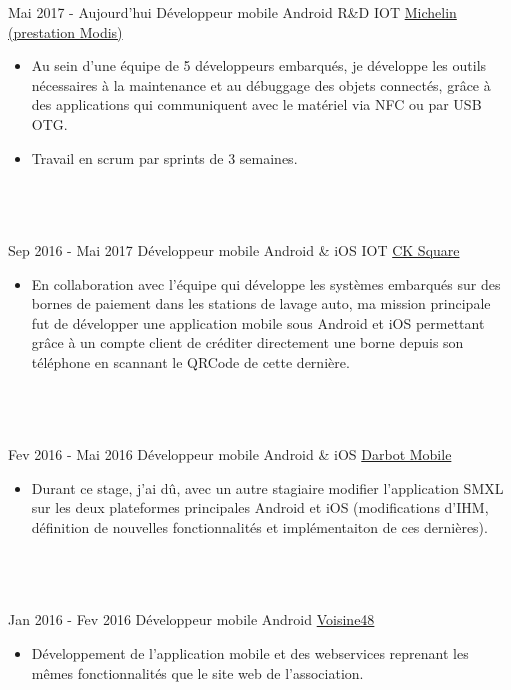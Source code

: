 \documentclass[letterpaper]{twentysecondcv} %
\begin{document}
\begin{twenty} %
\twentyitem
    	{Mai 2017 -}
		{Aujourd'hui}
        {Développeur mobile Android R\&D IOT}
        {\href{http://www.michelin.fr/}{Michelin (prestation Modis)}}
        {}
        {\begin{itemize}
        \item Au sein d'une équipe de 5 développeurs embarqués, je développe les outils nécessaires à la maintenance et au débuggage des objets connectés, grâce à des applications qui communiquent avec le matériel via NFC ou par USB OTG.
        \item Travail en scrum par sprints de 3 semaines.
        \end{itemize}}
        \\ \\ \\
	\twentyitem
    	{Sep 2016 -}
		{Mai 2017}
        {Développeur mobile Android \& iOS IOT}
        {\href{http://www.cksquare.fr/}{CK Square}}
        {}
        {
        {\begin{itemize}
        \item En collaboration avec l'équipe qui développe les systèmes embarqués sur des bornes de paiement dans les stations de lavage auto, ma mission principale fut de développer une application mobile sous Android et iOS permettant grâce à un compte client de créditer directement une borne depuis son téléphone en scannant le QRCode de cette dernière.
    \end{itemize}}
        }
    \\ \\ \\
    \twentyitem
   		{Fev 2016 -}
		{Mai 2016}
        {Développeur mobile Android \& iOS}
        {\href{https://www.smxlapp.com/}{Darbot Mobile}}
        {}
        {
        {\begin{itemize}
        \item Durant ce stage, j'ai dû, avec un autre stagiaire modifier l'application SMXL sur les deux plateformes principales Android et iOS (modifications d'IHM, définition de nouvelles fonctionnalités et implémentaiton de ces dernières).
    \end{itemize}}
        }
     \\ \\ \\
     \twentyitem
   		{Jan 2016 -}
		{Fev 2016 }
        {Développeur mobile Android}
        {\href{http://www.voisine48.fr/}{Voisine48}}
        {}
        {
        \begin{itemize}
        \item Développement de l'application mobile et des webservices reprenant les mêmes fonctionnalités que le site web de l'association.
    \end{itemize}
    	}
    	
    	\\ \\ \\
    
        
\end{twenty}
\end{document}
